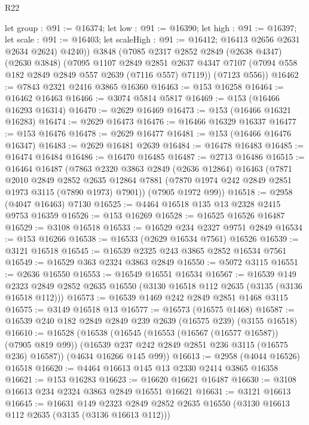 \begin{lexlean}{R22}
\begin{coremodule}
        let group : @91 := @16374;
        let low : @91 := @16390;
        let high : @91 := @16397;
        let scale : @91 := @16403; let scaleHigh : @91 := @16412; @16413 @2656 @2631 @2634 @2624)
        @4240))
    @3848
    (@7085
      @2317
      @2852
      @2849
      (@2638 @4347)
      (@2630 @3848)
      (@7095
        @1107
        @2849
        @2851
        @2637
        @4347
        @7107
        (@7094 @558 @182 @2849 @2849 @557 @2639 (@7116 @557) @7119))
      (@7123 @556))
@16462 := @7843 @2321 @2416 @3865 @16360
@16463 := @153 @16258
@16464 := @16462 @16463
@16466 := @3074 @5814 @5817
@16469 := @153 (@16466 @16293 @16314)
@16470 := @2629 @16469
@16473 := @153 (@16466 @16321 @16283)
@16474 := @2629 @16473
@16476 := @16466 @16329 @16337
@16477 := @153 @16476
@16478 := @2629 @16477
@16481 := @153 (@16466 @16476 @16347)
@16483 := @2629 @16481 @2639
@16484 := @16478 @16483
@16485 := @16474 @16484
@16486 := @16470 @16485
@16487 := @2713 @16486
@16515 := @16464
    @16487
    (@7863
      @2320
      @3863
      @2849
      (@2636 @12864)
      @16463
      (@7871
        @2010
        @2849
        @2852
        @2635
        @12864
        @7881
        (@7870 @1974 @242 @2849 @2851 @1973 @3115 (@7890 @1973) @7901))
      (@7905 @1972 @99))
@16518 := @2958 (@4047 @16463) @7130
@16525 := @4464 @16518 @135 @13 @2328 @2415 @9753 @16359
@16526 := @153 @16269
@16528 := @16525 @16526 @16487
@16529 := @3108 @16518
@16533 := @16529 @234 @2327 @9751 @2849
@16534 := @153 @16266
@16538 := @16533 (@2629 @16534 @7561) @16526
@16539 := @3121 @16518
@16545 := @16539 @2325 @243 @3865 @2852 @16534 @7561
@16549 := @16529 @363 @2324 @3863 @2849
@16550 := @5072 @3115
@16551 := @2636 @16550
@16553 := @16549 @16551 @16534
@16567 := @16539
    @149
    @2323
    @2849
    @2852
    @2635
    @16550
    (@3130 @16518 @112 @2635 (@3135 (@3136 @16518 @112)))
@16573 := @16539 @1469 @242 @2849 @2851 @1468 @3115
@16575 := @3149 @16518 @13
@16577 := @16573 (@16575 @1468)
@16587 := @16539 @240 @182 @2849 @2849 @239 @2639 (@16575 @239) (@3155 @16518)
@16610 := @16528
    (@16538
      (@16545
        (@16553 (@16567 (@16577 @16587)) (@7905 @819 @99))
        (@16539 @237 @242 @2849 @2851 @236 @3115 (@16575 @236) @16587))
      (@4634 @16266 @145 @99))
@16613 := @2958 (@4044 @16526) @16518
@16620 := @4464 @16613 @145 @13 @2330 @2414 @3865 @16358
@16621 := @153 @16283
@16623 := @16620 @16621 @16487
@16630 := @3108 @16613 @234 @2324 @3863 @2849 @16551 @16621
@16631 := @3121 @16613
@16645 := @16631
    @149
    @2323
    @2849
    @2852
    @2635
    @16550
    (@3130 @16613 @112 @2635 (@3135 (@3136 @16613 @112)))

\end{coremodule}
\end{lexlean}
